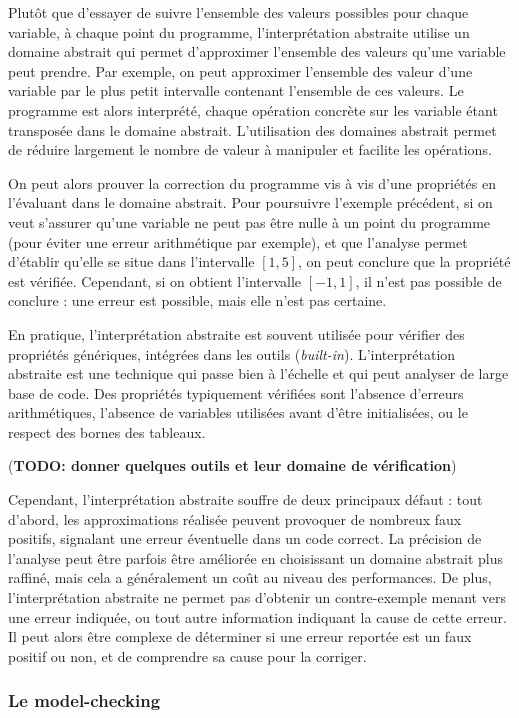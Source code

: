 Plutôt que d'essayer de suivre l'ensemble des valeurs possibles pour
chaque variable, à chaque point du programme, l'interprétation abstraite
utilise un domaine abstrait qui permet d'approximer l'ensemble des
valeurs qu'une variable peut prendre. Par exemple, on peut approximer
l'ensemble des valeur d'une variable par le plus petit intervalle
contenant l'ensemble de ces valeurs. Le programme est alors interprété,
chaque opération concrète sur les variable étant transposée dans le
domaine abstrait. L'utilisation des domaines abstrait permet de réduire
largement le nombre de valeur à manipuler et facilite les opérations.

On peut alors prouver la correction du programme vis à vis d'une
propriétés en l'évaluant dans le domaine abstrait. Pour poursuivre
l'exemple précédent, si on veut s'assurer qu'une variable ne peut pas
être nulle à un point du programme (pour éviter une erreur arithmétique
par exemple), et que l'analyse permet d'établir qu'elle se situe dans
l'intervalle \([1, 5]\), on peut conclure que la propriété est vérifiée.
Cependant, si on obtient l'intervalle \([-1, 1]\), il n'est pas possible
de conclure : une erreur est possible, mais elle n'est pas certaine.

En pratique, l'interprétation abstraite est souvent utilisée pour
vérifier des propriétés génériques, intégrées dans les outils
(\emph{built-in}). L'interprétation abstraite est une technique qui
passe bien à l'échelle et qui peut analyser de large base de code. Des
propriétés typiquement vérifiées sont l'absence d'erreurs arithmétiques,
l'absence de variables utilisées avant d'être initialisées, ou le
respect des bornes des tableaux.

(\textbf{TODO: donner quelques outils et leur domaine de vérification})

Cependant, l'interprétation abstraite souffre de deux principaux défaut
: tout d'abord, les approximations réalisée peuvent provoquer de
nombreux faux positifs, signalant une erreur éventuelle dans un code
correct. La précision de l'analyse peut être parfois être améliorée en
choisissant un domaine abstrait plus raffiné, mais cela a généralement
un coût au niveau des performances. De plus, l'interprétation abstraite
ne permet pas d'obtenir un contre-exemple menant vers une erreur
indiquée, ou tout autre information indiquant la cause de cette erreur.
Il peut alors être complexe de déterminer si une erreur reportée est un
faux positif ou non, et de comprendre sa cause pour la corriger.

\subsubsection{Le model-checking}

